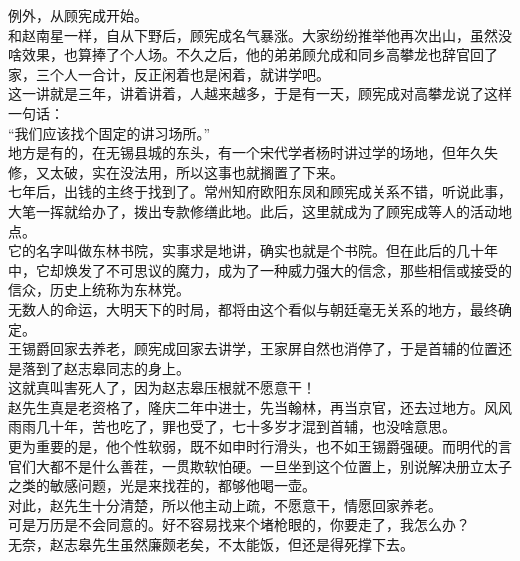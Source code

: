 \begin{multicols}{\theparacolNo}
例外，从顾宪成开始。\\

和赵南星一样，自从下野后，顾宪成名气暴涨。大家纷纷推举他再次出山，虽然没啥效果，也算捧了个人场。不久之后，他的弟弟顾允成和同乡高攀龙也辞官回了家，三个人一合计，反正闲着也是闲着，就讲学吧。\\

这一讲就是三年，讲着讲着，人越来越多，于是有一天，顾宪成对高攀龙说了这样一句话：\\

“我们应该找个固定的讲习场所。”\\

地方是有的，在无锡县城的东头，有一个宋代学者杨时讲过学的场地，但年久失修，又太破，实在没法用，所以这事也就搁置了下来。\\

七年后，出钱的主终于找到了。常州知府欧阳东凤和顾宪成关系不错，听说此事，大笔一挥就给办了，拨出专款修缮此地。此后，这里就成为了顾宪成等人的活动地点。\\

它的名字叫做东林书院，实事求是地讲，确实也就是个书院。但在此后的几十年中，它却焕发了不可思议的魔力，成为了一种威力强大的信念，那些相信或接受的信众，历史上统称为东林党。\\

无数人的命运，大明天下的时局，都将由这个看似与朝廷毫无关系的地方，最终确定。\\

王锡爵回家去养老，顾宪成回家去讲学，王家屏自然也消停了，于是首辅的位置还是落到了赵志皋同志的身上。\\

这就真叫害死人了，因为赵志皋压根就不愿意干！\\

赵先生真是老资格了，隆庆二年中进士，先当翰林，再当京官，还去过地方。风风雨雨几十年，苦也吃了，罪也受了，七十多岁才混到首辅，也没啥意思。\\

更为重要的是，他个性软弱，既不如申时行滑头，也不如王锡爵强硬。而明代的言官们大都不是什么善茬，一贯欺软怕硬。一旦坐到这个位置上，别说解决册立太子之类的敏感问题，光是来找茬的，都够他喝一壶。\\

对此，赵先生十分清楚，所以他主动上疏，不愿意干，情愿回家养老。\\

可是万历是不会同意的。好不容易找来个堵枪眼的，你要走了，我怎么办？\\

无奈，赵志皋先生虽然廉颇老矣，不太能饭，但还是得死撑下去。\\


\end{multicols}
